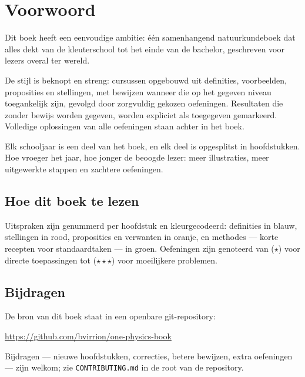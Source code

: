 \chapter{Voorwoord}

Dit boek heeft een eenvoudige ambitie: één samenhangend natuurkundeboek
dat alles dekt van de kleuterschool tot het einde van de bachelor,
geschreven voor lezers overal ter wereld.

De stijl is beknopt en streng: cursussen opgebouwd uit definities,
voorbeelden, proposities en stellingen, met bewijzen wanneer die op het
gegeven niveau toegankelijk zijn, gevolgd door zorgvuldig gekozen
oefeningen. Resultaten die zonder bewijs worden gegeven, worden
expliciet als toegegeven gemarkeerd. Volledige oplossingen van alle
oefeningen staan achter in het boek.

Elk schooljaar is een deel van het boek, en elk deel is opgesplitst in
hoofdstukken. Hoe vroeger het jaar, hoe jonger de beoogde lezer: meer
illustraties, meer uitgewerkte stappen en zachtere oefeningen.

\section*{Hoe dit boek te lezen}

Uitspraken zijn genummerd per hoofdstuk en kleurgecodeerd: definities in
blauw, stellingen in rood, proposities en verwanten in oranje, en
methodes --- korte recepten voor standaardtaken --- in groen. Oefeningen
zijn genoteerd van ($\star$) voor directe toepassingen tot
($\star\star\star$) voor moeilijkere problemen.

\section*{Bijdragen}

De bron van dit boek staat in een openbare git-repository:
\begin{center}
\url{https://github.com/bvirrion/one-physics-book}
\end{center}
Bijdragen --- nieuwe hoofdstukken, correcties, betere bewijzen, extra
oefeningen --- zijn welkom; zie \texttt{CONTRIBUTING.md} in de root van
de repository.
